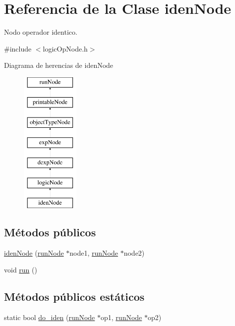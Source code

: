 \hypertarget{classidenNode}{\section{Referencia de la Clase iden\-Node}
\label{classidenNode}
}


Nodo operador identico.  




{\ttfamily \#include $<$logic\-Op\-Node.\-h$>$}

Diagrama de herencias de iden\-Node\begin{figure}[H]
\begin{center}
\leavevmode
\includegraphics[height=7.000000cm]{classidenNode}
\end{center}
\end{figure}
\subsection*{Métodos públicos}
\begin{DoxyCompactItemize}
\item 
\hyperlink{classidenNode_a06db214820dedeff99b0383b6f01920d}{iden\-Node} (\hyperlink{classrunNode}{run\-Node} $\ast$node1, \hyperlink{classrunNode}{run\-Node} $\ast$node2)
\item 
void \hyperlink{classidenNode_a6e5cacd5b21f736ae0b6049d9381e5d6}{run} ()
\end{DoxyCompactItemize}
\subsection*{Métodos públicos estáticos}
\begin{DoxyCompactItemize}
\item 
static bool \hyperlink{classidenNode_acf57e22bb562aadc4eb3e7b1e73b7733}{do\-\_\-iden} (\hyperlink{classrunNode}{run\-Node} $\ast$op1, \hyperlink{classrunNode}{run\-Node} $\ast$op2)
\end{DoxyCompactItemize}
